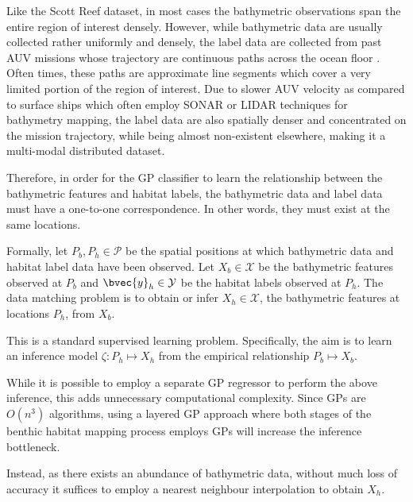 			Like the Scott Reef dataset, in most cases the bathymetric observations span the entire region of interest densely. However, while bathymetric data are usually collected rather uniformly and densely, the label data are collected from past AUV missions whose trajectory are continuous paths across the ocean floor \citep{Squidle}. Often times, these paths are approximate line segments which cover a very limited portion of the region of interest. Due to slower AUV velocity as compared to surface ships which often employ SONAR or LIDAR techniques for bathymetry mapping, the label data are also spatially denser and concentrated on the mission trajectory, while being almost non-existent elsewhere, making it a multi-modal distributed dataset. 
			
			Therefore, in order for the GP classifier to learn the relationship between the bathymetric features and habitat labels, the bathymetric data and label data must have a one-to-one correspondence. In other words, they must exist at the same locations. 
			
			Formally, let $P_{b}, P_{h} \in \mathcal{P}$ be the spatial positions at which bathymetric data and habitat label data have been observed. Let $X_{b} \in \mathcal{X}$ be the bathymetric features observed at $P_{b}$ and $\bvec{y}_{h} \in \mathcal{Y}$ be the habitat labels observed at $P_{h}$. The data matching problem is to obtain or infer $X_{h} \in \mathcal{X}$, the bathymetric features at locations $P_{h}$, from $X_{b}$.
			
			This is a standard supervised learning problem. Specifically, the aim is to learn an inference model $\zeta: P_{h} \mapsto X_{h}$ from the empirical relationship $P_{b} \mapsto X_{b}$.
			
			While it is possible to employ a separate GP regressor to perform the above inference, this adds unnecessary computational complexity. Since GPs are $O(n^{3})$ algorithms, using a layered GP approach where both stages of the benthic habitat mapping process employs GPs will increase the inference bottleneck.
			
			Instead, as there exists an abundance of bathymetric data, without much loss of accuracy it suffices to employ a nearest neighbour interpolation to obtain $X_{h}$. 
			
